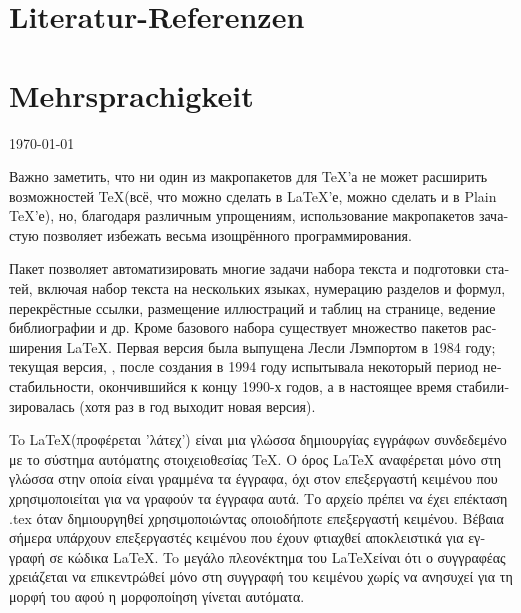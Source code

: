 \documentclass{scrartcl}
\begin{document}
\section{Literatur-Referenzen}
		
	\blindtext\cite{Voss2013}
	\blindtext\cite{Willberg2010,Forssman2014}

	\blindtext\cite{Kohm2014,Dinter2010}
	
	\blindtext\cite{Kohm2014}
	\blindtext\cite{Kohm2014}
	
	\blindtext\cite{Mittelbach2007}
	
	\blindtext\cite{Knuth1984}
	
	\printbibliography
	
\section{Mehrsprachigkeit}
	\begin{english}
		\blindtext
	\end{english}
	
	\blindtext \textrussian{\today}
	
	\begin{russian}
		Важно заметить, что ни один из макропакетов для \TeX’а не может расширить возмож\-ностей \TeX (всё, что можно сделать в LaTeX’е, можно сделать и в Plain \TeX’е), но, благодаря различным упрощениям, использование макропакетов зачастую позволяет избежать весьма изощрённого программирования.

		Пакет позволяет автоматизировать многие задачи набора текста и подготовки статей, включая набор текста на нескольких языках, нумерацию разделов и формул, перекрёстные ссылки, размещение иллюстраций и таблиц на странице, ведение библиографии и др. Кроме базового набора существует множество пакетов расширения \LaTeX. Первая версия была выпущена Лесли Лэмпортом в 1984 году; текущая версия, \LaTeXe, после создания в 1994 году испытывала некоторый период нестабильности, окончившийся к концу 1990-х годов, а в настоящее время стабилизировалась (хотя раз в год выходит новая версия).
	\end{russian}
	
	\begin{french}
		\blindtext
	\end{french}

	\begin{greek}
		To \LaTeX (προφέρεται 'λάτεχ') είναι μια γλώσσα δημιουργίας εγγράφων συνδεδεμένο με το σύστημα αυτόματης στοιχειοθεσίας TeX. Ο όρος LaTeX αναφέρεται μόνο στη γλώσσα στην οποία είναι γραμμένα τα έγγραφα, όχι στον επεξεργαστή κειμένου που χρησιμοποιείται για να γραφούν τα έγγραφα αυτά. Το αρχείο πρέπει να έχει επέκταση .tex όταν δημιουργηθεί χρησιμοποιώντας οποιοδήποτε επεξεργαστή κειμένου. Βέβαια σήμερα υπάρχουν επεξεργαστές κειμένου που έχουν φτιαχθεί αποκλειστικά για εγγραφή σε κώδικα \LaTeX. To μεγάλο πλεονέκτημα του \LaTeX είναι ότι ο συγγραφέας χρειάζεται να επικεντρώθεί μόνο στη συγγραφή του κειμένου χωρίς να ανησυχεί για τη μορφή του αφού η μορφοποίηση γίνεται αυτόματα.
	\end{greek}
\end{document}
